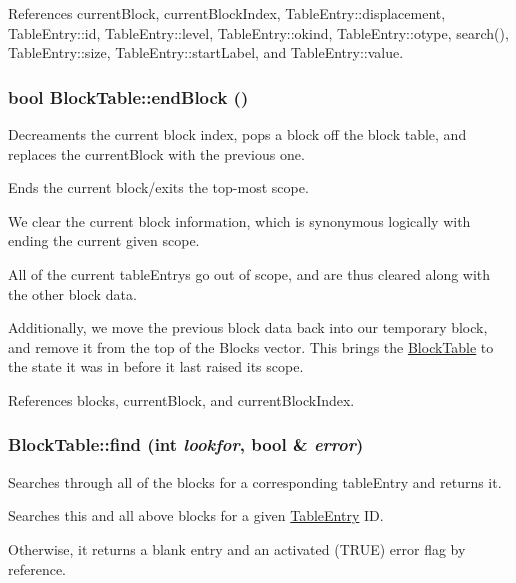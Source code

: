 References currentBlock, currentBlockIndex, TableEntry::displacement, TableEntry::id, TableEntry::level, TableEntry::okind, TableEntry::otype, search(), TableEntry::size, TableEntry::startLabel, and TableEntry::value.

\hypertarget{classBlockTable_af91746a425e587ff501359f1df179ca8}{
\subsubsection[{endBlock}]{\setlength{\rightskip}{0pt plus 5cm}bool BlockTable::endBlock ()}}
\label{classBlockTable_af91746a425e587ff501359f1df179ca8}


Decreaments the current block index, pops a block off the block table, and replaces the currentBlock with the previous one. 

Ends the current block/exits the top-\/most scope.

We clear the current block information, which is synonymous logically with ending the current given scope.

All of the current tableEntrys go out of scope, and are thus cleared along with the other block data.

Additionally, we move the previous block data back into our temporary block, and remove it from the top of the Blocks vector. This brings the \hyperlink{classBlockTable}{BlockTable} to the state it was in before it last raised its scope. 

References blocks, currentBlock, and currentBlockIndex.

\hypertarget{classBlockTable_a53d24a1a4460701c8129eabcebfa0870}{
\subsubsection[{find}]{ BlockTable::find (int {\em lookfor}, \/  bool \& {\em error})}}
\label{classBlockTable_a53d24a1a4460701c8129eabcebfa0870}


Searches through all of the blocks for a corresponding tableEntry and returns it. 

Searches this and all above blocks for a given \hyperlink{structTableEntry}{TableEntry} ID.

Otherwise, it returns a blank entry and an activated (TRUE) error flag by reference.

